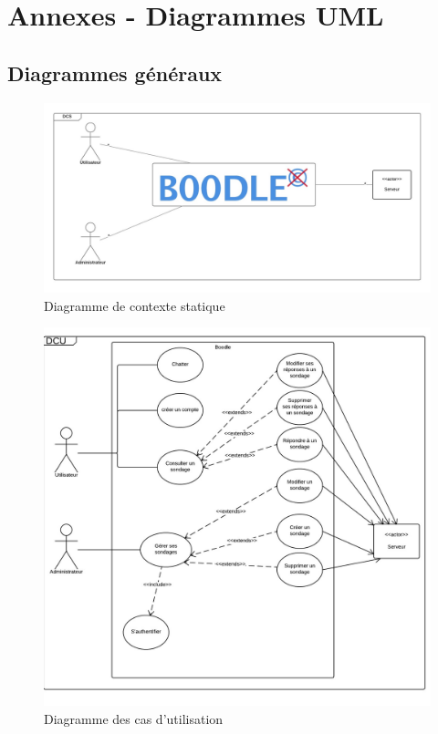 \documentclass[titlepage]{report}
\begin{document}
\part{Annexes - Diagrammes UML}
\label{part_allUML}

\chapter{Diagrammes généraux}

\begin{figure}[h]
	\caption{Diagramme de contexte statique}
	\label{annexe_diagramme_contexteStatique}
	\centering
	\includegraphics[width=\textwidth]{figures/diagrammes/contexteStatique.png}
\end{figure}

\begin{figure}[h]
	\caption{Diagramme des cas d'utilisation}
	\label{annexe_diagramme_casDUtilisation}
	\centering
	\includegraphics[width=\textwidth]{figures/diagrammes/casDUtilisation.png}
\end{figure}
\end{document}
